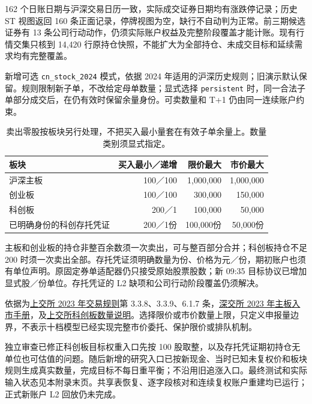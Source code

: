 162 个日账日期与沪深交易日历一致，实际成交证券日期均有涨跌停记录；历史 ST 视图返回 160 条正面记录，停牌视图为空，缺行不自动判为正常。前三期候选证券有 13 条公司行动动作，仍须实际账户权益及完整阶段覆盖才能计账。现有行情交集只核到 14,420 行原持仓快照，不能扩大为全部持仓、未成交目标和延续需求均有完整覆盖。

\clearpage
{}
新增可选 \texttt{cn\_stock\_2024} 模式，依据 2024 年适用的沪深历史规则；旧演示默认保留。规则限制新子单，不改给定母单数量；显式选择 \texttt{persistent} 时，同一合法子单部分成交后，在仍有效时保留余量身份。可卖数量和 T+1 仍由同一连续账户约束。

\begin{table}[H]\centering\small
\begin{tabularx}{\linewidth}{Y r r r}
\toprule 板块 & 买入最小／递增 & 限价最大 & 市价最大\\\midrule
沪深主板 & 100／100 & 1,000,000 & 1,000,000\\
创业板 & 100／100 & 300,000 & 150,000\\
科创板 & 200／1 & 100,000 & 50,000\\
已明确身份的科创存托凭证 & 200／1份 & 100,000份 & 50,000份\\
\bottomrule
\end{tabularx}
\caption{卖出零股按板块另行处理，不把买入最小量套在有效子单余量上。数量类别须显式指定。}
\end{table}

主板和创业板的持仓非整百余数须一次卖出，可与整百部分合并；科创板持仓不足 200 时须一次卖出全部。存托凭证须明确数量为份、价格为元／份，期初账户也须有单位声明。原固定券单适配器仍只接受原始股票股数；新 09:35 目标协议已增加显式股／份单位。存托凭证的 L2 缺项和公司行动阶段覆盖仍须解决。

依据为\href{https://www.sse.com.cn/lawandrules/sselawsrules2025/repeal/rules/c/c_20250612_10824490.shtml}{上交所 2023 年交易规则}第 3.3.8、3.3.9、6.1.7 条，\href{https://investor.szse.cn/institute/rules/t20230706_601604.html}{深交所 2023 年主板入市手册}，及\href{https://edu.sse.com.cn/tib/qa/c/4866268.shtml}{上交所科创板数量说明}。选择限价或市价数量上限，只定义申报量边界，不表示十档模型已经实现完整市价委托、保护限价或排队机制。

独立审查已修正科创板目标权重入口先按 100 股取整，以及存托凭证期初持仓无单位也可估值的问题。随后新增的研究入口已按新现金、当时已知未复权价和板块规则生成真实数量，完成目标不每日重平衡；不沿用旧追涨入口。最终测试和实际输入状态见本附录末页。共享表恢复、逐字段核对和连续复权账户重建均已运行；正式新账户 L2 回放仍未完成。


